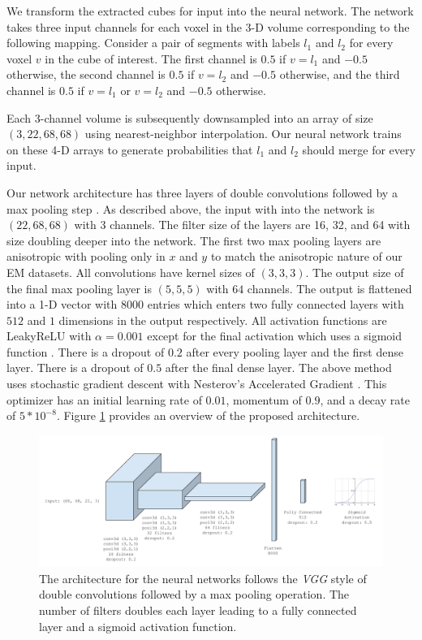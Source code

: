 We transform the extracted cubes for input into the neural network. The network takes three input channels for each voxel in the 3-D volume corresponding to the following mapping. Consider a pair of segments with labels $l_1$ and $l_2$ for every voxel $v$ in the cube of interest. The first channel is $0.5$ if $v = l_1$ and $-0.5$ otherwise, the second channel is $0.5$ if $v = l_2$ and $-0.5$ otherwise, and the third channel is $0.5$ if $v = l_1$ or $v = l_2$ and $-0.5$ otherwise. 

Each 3-channel volume is subsequently downsampled into an array of size $(3, 22, 68, 68)$ using nearest-neighbor interpolation. Our neural network trains on these 4-D arrays to generate probabilities that $l_1$ and $l_2$ should merge for every input.

Our network architecture has three layers of double convolutions followed by a max pooling step \cite{chatfield2014return}. As described above, the input with into the network is $(22, 68, 68)$ with $3$ channels. The filter size of the layers are 16, 32, and 64 with size doubling deeper into the network. The first two max pooling layers are anisotropic with pooling only in $x$ and $y$ to match the anisotropic nature of our EM datasets. All convolutions have kernel sizes of $(3, 3, 3)$. The output size of the final max pooling layer is $(5, 5, 5)$ with $64$ channels. The output is flattened into a 1-D vector with $8000$ entries which enters two fully connected layers with $512$ and $1$ dimensions in the output respectively. All activation functions are LeakyReLU with $\alpha=0.001$ except for the final activation which uses a sigmoid function \cite{funahashi1989approximate,maas2013rectifier}. There is a dropout of $0.2$ after every pooling layer and the first dense layer. There is a dropout of $0.5$ after the final dense layer. The above method uses stochastic gradient descent with Nesterov's Accelerated Gradient \cite{nesterov1983method}. This optimizer has an initial learning rate of $0.01$, momentum of $0.9$, and a decay rate of $5*10^{-8}$. Figure \ref{fig:architecture} provides an overview of the proposed architecture. 

\begin{figure}[t]
	\centering
	\includegraphics[width=0.95\linewidth]{figures/architecture.png}
	\caption{The architecture for the neural networks follows the \textit{VGG} style of double convolutions followed by a max pooling operation. The number of filters doubles each layer leading to a fully connected layer and a sigmoid activation function.}
	\label{fig:architecture}
\end{figure}


